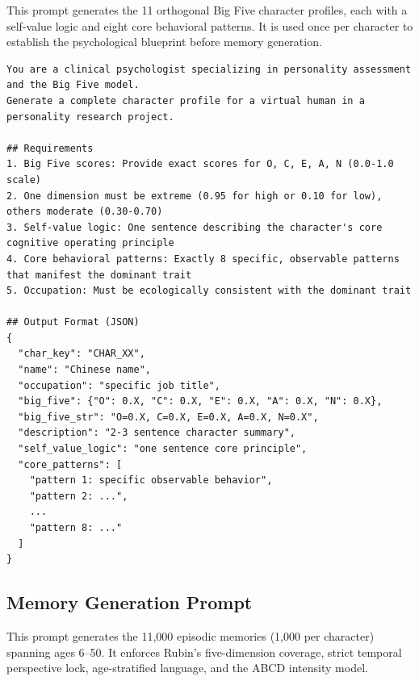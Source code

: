 This prompt generates the 11 orthogonal Big Five character profiles, each with a self-value logic and eight core behavioral patterns. It is used once per character to establish the psychological blueprint before memory generation.

\begin{tcolorbox}[
  breakable,
  colback=blue!5,
  colframe=blue!60!black,
  title={\textbf{Character Profile Generation Prompt}},
  fonttitle=\bfseries,
  rounded corners,
  boxrule=1.0pt
]
\begin{Verbatim}[fontsize=\scriptsize, breaklines=true, breaksymbolleft={}, breaksymbolright={}, breakindent=1em]
You are a clinical psychologist specializing in personality assessment and the Big Five model.
Generate a complete character profile for a virtual human in a personality research project.

## Requirements
1. Big Five scores: Provide exact scores for O, C, E, A, N (0.0-1.0 scale)
2. One dimension must be extreme (0.95 for high or 0.10 for low), others moderate (0.30-0.70)
3. Self-value logic: One sentence describing the character's core cognitive operating principle
4. Core behavioral patterns: Exactly 8 specific, observable patterns that manifest the dominant trait
5. Occupation: Must be ecologically consistent with the dominant trait

## Output Format (JSON)
{
  "char_key": "CHAR_XX",
  "name": "Chinese name",
  "occupation": "specific job title",
  "big_five": {"O": 0.X, "C": 0.X, "E": 0.X, "A": 0.X, "N": 0.X},
  "big_five_str": "O=0.X, C=0.X, E=0.X, A=0.X, N=0.X",
  "description": "2-3 sentence character summary",
  "self_value_logic": "one sentence core principle",
  "core_patterns": [
    "pattern 1: specific observable behavior",
    "pattern 2: ...",
    ...
    "pattern 8: ..."
  ]
}
\end{Verbatim}
\end{tcolorbox}

\subsection{Memory Generation Prompt}
\label{app:prompt_memory}

This prompt generates the 11,000 episodic memories (1,000 per character) spanning ages 6--50. It enforces Rubin's five-dimension coverage, strict temporal perspective lock, age-stratified language, and the ABCD intensity model.

